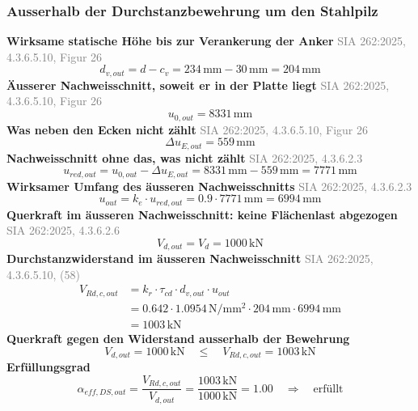 \documentclass[11pt,a4paper]{article}
\newcommand{\normref}[1]{{\small\textcolor{gray}{#1}}}
\begin{document}
\subsubsection{Ausserhalb der Durchstanzbewehrung um den Stahlpilz}
\noindent\textbf{Wirksame statische Höhe bis zur Verankerung der Anker} \hfill \normref{SIA 262:2025, 4.3.6.5.10, Figur 26}
\begin{equation*}
d_{v,out} = d - c_v = 234\,\mathrm{mm} - 30\,\mathrm{mm} = 204\,\mathrm{mm}
\end{equation*}
\noindent\textbf{Äusserer Nachweisschnitt, soweit er in der Platte liegt} \hfill \normref{SIA 262:2025, 4.3.6.5.10, Figur 26}
\begin{equation*}
u_{0,out} = 8331\,\mathrm{mm}
\end{equation*}
\noindent\textbf{Was neben den Ecken nicht zählt} \hfill \normref{SIA 262:2025, 4.3.6.5.10, Figur 26}
\begin{equation*}
\Delta u_{E,out} = 559\,\mathrm{mm}
\end{equation*}
\noindent\textbf{Nachweisschnitt ohne das, was nicht zählt} \hfill \normref{SIA 262:2025, 4.3.6.2.3}
\begin{equation*}
u_{red,out} = u_{0,out} - \Delta u_{E,out} = 8331\,\mathrm{mm} - 559\,\mathrm{mm} = 7771\,\mathrm{mm}
\end{equation*}
\noindent\textbf{Wirksamer Umfang des äusseren Nachweisschnitts} \hfill \normref{SIA 262:2025, 4.3.6.2.3}
\begin{equation*}
u_{out} = k_e \cdot u_{red,out} = 0.9 \cdot 7771\,\mathrm{mm} = 6994\,\mathrm{mm}
\end{equation*}
\noindent\textbf{Querkraft im äusseren Nachweisschnitt: keine Flächenlast abgezogen} \hfill \normref{SIA 262:2025, 4.3.6.2.6}
\begin{equation*}
V_{d,out} = V_d = 1000\,\mathrm{kN}
\end{equation*}
\noindent\textbf{Durchstanzwiderstand im äusseren Nachweisschnitt} \hfill \normref{SIA 262:2025, 4.3.6.5.10, (58)}
\begin{equation*}
\begin{aligned}
  V_{Rd,c,out} &= k_r \cdot \tau_{cd} \cdot d_{v,out} \cdot u_{out} \\
  &= 0.642 \cdot 1.0954\,\mathrm{N}/\mathrm{mm}^{2} \cdot 204\,\mathrm{mm} \cdot 6994\,\mathrm{mm} \\
  &= 1003\,\mathrm{kN}
\end{aligned}
\end{equation*}
\noindent\textbf{Querkraft gegen den Widerstand ausserhalb der Bewehrung}
\begin{equation*}
V_{d,out} = 1000\,\mathrm{kN} \quad \le \quad V_{Rd,c,out} = 1003\,\mathrm{kN}
\end{equation*}
\noindent\textbf{Erfüllungsgrad}
\begin{equation*}
\alpha_{eff,DS,out} = \frac{V_{Rd,c,out}}{V_{d,out}} = \frac{1003\,\mathrm{kN}}{1000\,\mathrm{kN}} = 1.00 \quad \Rightarrow \quad \text{erfüllt}
\end{equation*}
\end{document}
